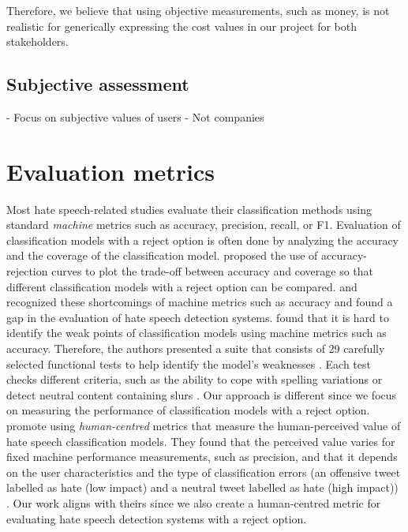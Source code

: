 Therefore, we believe that using objective measurements, such as money, is not realistic for generically expressing the cost values in our project for both stakeholders.

\subsection{Subjective assessment}
- Focus on subjective values of users
- Not companies


\section{Evaluation metrics}
Most hate speech-related studies evaluate their classification methods using standard \textit{machine} metrics such as accuracy, precision, recall, or F1.
% 
Evaluation of classification models with a reject option is often done by analyzing the accuracy and the coverage of the classification model.
%
\citet{nadeem2009reject} proposed the use of accuracy-rejection curves to plot the trade-off between accuracy and coverage so that different classification models with a reject option can be compared.
%
\citet{rottger2020hatecheck} and \citet{olteanu2017limits} recognized these shortcomings of machine metrics such as accuracy and found a gap in the evaluation of hate speech detection systems.
%
\citet{rottger2020hatecheck} found that it is hard to identify the weak points of classification models using machine metrics such as accuracy.
%
Therefore, the authors presented a suite that consists of 29 carefully selected functional tests to help identify the model's weaknesses \citep{rottger2020hatecheck}.
%
Each test checks different criteria, such as the ability to cope with spelling variations or detect neutral content containing slurs \citep{rottger2020hatecheck}.
%
Our approach is different since we focus on measuring the performance of classification models with a reject option.
%
\citet{olteanu2017limits} promote using \textit{human-centred} metrics that measure the human-perceived value of hate speech classification models.
%
They found that the perceived value varies for fixed machine performance measurements, such as precision, and that it depends on the user characteristics and the type of classification errors (an offensive tweet labelled as hate (low impact) and a neutral tweet labelled as hate (high impact)) \citep{olteanu2017limits}.
%
Our work aligns with theirs since we also create a human-centred metric for evaluating hate speech detection systems with a reject option.

